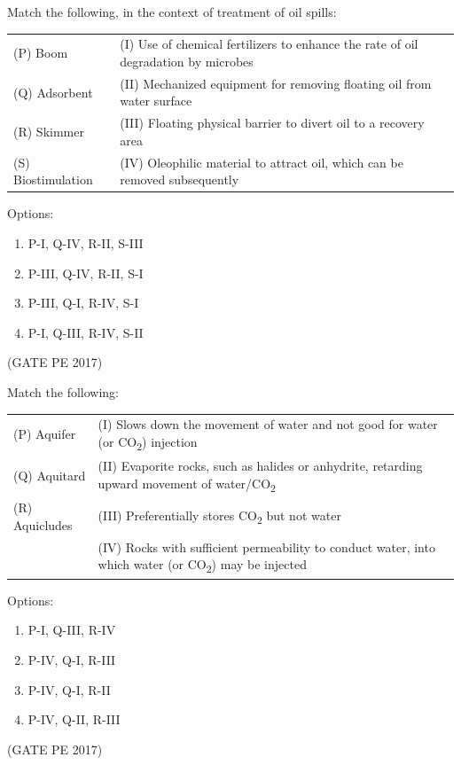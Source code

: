 \documentclass[journal,12pt,onecolumn]{IEEEtran}
\theoremstyle{remark}
\begin{document}
\begin{enumerate}
{\item Match the following, in the context of treatment of oil spills:\\

\begin{tabular}{ll}
(P) Boom          & (I) Use of chemical fertilizers to enhance the                      rate of oil degradation by microbes \\
(Q) Adsorbent     & (II) Mechanized equipment for removing floating                      oil from water surface \\
(R) Skimmer       & (III) Floating physical barrier to divert oil                        to a recovery area \\
(S) Biostimulation & (IV) Oleophilic material to attract oil, which                       can be removed subsequently \\
\end{tabular}
Options:
\begin{enumerate}
\item P-I, Q-IV, R-II, S-III  
\item P-III, Q-IV, R-II, S-I  
\item P-III, Q-I, R-IV, S-I  
\item P-I, Q-III, R-IV, S-II  
\end{enumerate}
\hfill{(GATE PE 2017)}

\item Match the following:\\

\begin{tabular}{ll}
(P) Aquifer     & (I) Slows down the movement of water and
                not good for water (or CO\textsubscript{2}) injection \\
(Q) Aquitard    & (II) Evaporite rocks, such as halides or 
                 anhydrite, retarding upward movement
                 of water/CO\textsubscript{2} \\
(R) Aquicludes  & (III) Preferentially stores CO\textsubscript{2}                      but not water \\
                & (IV) Rocks with sufficient permeability to conduct water, into which water (or CO\textsubscript{2}) may be injected \\
\end{tabular}

Options:
\begin{enumerate}
\item P-I, Q-III, R-IV  
\item P-IV, Q-I, R-III  
\item P-IV, Q-I, R-II  
\item P-IV, Q-II, R-III  
\end{enumerate}
\hfill{(GATE PE 2017)}

}
\end{enumerate}
\end{document}
